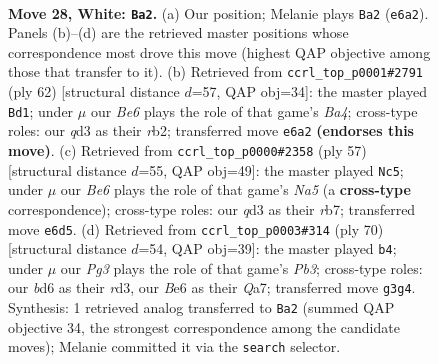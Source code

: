 \documentclass[11pt]{article}
\begin{document}
\clearpage

\begin{figure}[p]\centering
\begin{subfigure}{0.46\textwidth}\centering
\resizebox{\linewidth}{!}{%
\newchessgame
\chessboard[
  setfen={8/pp5p/3bB1pk/8/8/P2q2P1/1P3P1P/4R1K1 w - - 1 28},
  showmover=false,
  pgfstyle=straightmove, color=movearrow, markmove={e6-a2}
]}
\caption{}
\end{subfigure}\hfill
\begin{subfigure}{0.46\textwidth}\centering
\resizebox{\linewidth}{!}{%
\newchessgame
\chessboard[
  setfen={6k1/2p2p2/2Pb2pp/8/B7/4P1P1/1r3P1P/R5K1 w - - 3 32},
  showmover=false,
  pgfstyle=straightmove, color=movearrow, markmove={a4-d1}
]}
\caption{}
\end{subfigure}
\\[4pt]
\begin{subfigure}{0.46\textwidth}\centering
\resizebox{\linewidth}{!}{%
\newchessgame
\chessboard[
  setfen={5rk1/1R3p1p/p5p1/3P4/n7/3B3P/2P3PK/8 b - - 0 29},
  showmover=false,
  pgfstyle=straightmove, color=movearrow, markmove={a4-c5}
]}
\caption{}
\end{subfigure}\hfill
\begin{subfigure}{0.46\textwidth}\centering
\resizebox{\linewidth}{!}{%
\newchessgame
\chessboard[
  setfen={6k1/Q4pp1/4p2p/8/4q2P/PP1r2P1/5P2/2R3K1 w - - 1 36},
  showmover=false,
  pgfstyle=straightmove, color=movearrow, markmove={b3-b4}
]}
\caption{}
\end{subfigure}
\caption{\textbf{Move 28, White: \texttt{Ba2}.} (a) Our position; Melanie plays \texttt{Ba2} (\texttt{e6a2}). Panels (b)--(d) are the retrieved master positions whose correspondence most drove this move (highest QAP objective among those that transfer to it). (b) Retrieved from \texttt{ccrl\_top\_p0001\#2791} (ply 62) [structural distance $d$=57, QAP obj=34]: the master played \texttt{Bd1}; under $\mu$ our \emph{Be6} plays the role of that game's \emph{Ba4}; cross-type roles: our \emph{q}d3 as their \emph{r}b2; transferred move \texttt{e6a2} \textbf{(endorses this move)}. (c) Retrieved from \texttt{ccrl\_top\_p0000\#2358} (ply 57) [structural distance $d$=55, QAP obj=49]: the master played \texttt{Nc5}; under $\mu$ our \emph{Be6} plays the role of that game's \emph{Na5} (a \textbf{cross-type} correspondence); cross-type roles: our \emph{q}d3 as their \emph{r}b7; transferred move \texttt{e6d5}. (d) Retrieved from \texttt{ccrl\_top\_p0003\#314} (ply 70) [structural distance $d$=54, QAP obj=39]: the master played \texttt{b4}; under $\mu$ our \emph{Pg3} plays the role of that game's \emph{Pb3}; cross-type roles: our \emph{b}d6 as their \emph{r}d3, our \emph{B}e6 as their \emph{Q}a7; transferred move \texttt{g3g4}. Synthesis: 1 retrieved analog transferred to \texttt{Ba2} (summed QAP objective 34, the strongest correspondence among the candidate moves); Melanie committed it via the \texttt{search} selector.}
\label{fig:thought-m54}
\end{figure}
\end{document}
